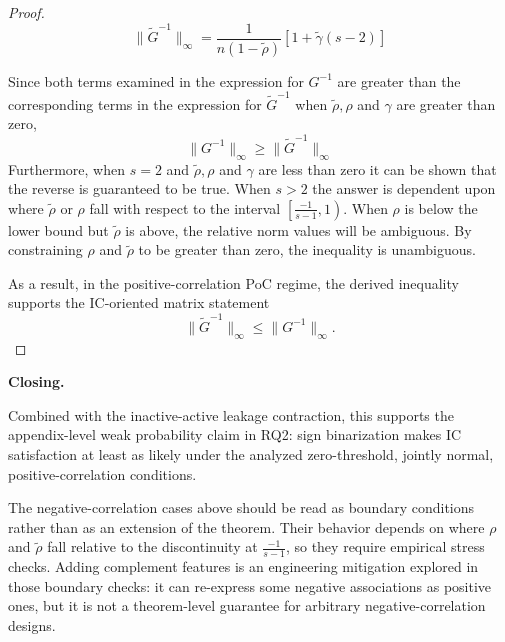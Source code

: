 \begin{proof}
\begin{equation}\label{eq:app-lemma4-binarized-inverse-norm}
\|\tilde{G}^{-1}\|_\infty = \frac{1}{n (1 - \tilde{\rho})} \left[ 1 + \tilde{\gamma} (s - 2) \right]
\end{equation}

Since both terms examined in the expression for $ G^{-1} $ are greater than the corresponding terms in the expression for $ \tilde{G}^{-1} $ when $ \tilde{\rho}, \rho $ and $ \gamma $ are greater than zero,
\begin{equation}\label{eq:app-lemma4-norm-order}
\|G^{-1}\|_\infty \geq \|\tilde{G}^{-1}\|_\infty
\end{equation}
Furthermore, when $ s = 2 $ and $ \tilde{\rho}, \rho $ and $ \gamma $ are less than zero it can be shown that the reverse is guaranteed to be true. When $ s > 2 $ the answer is dependent upon where $\tilde{\rho}$ or $ \rho $ fall with respect to the interval $ \left[\frac{-1}{s-1}, 1 \right) $. When $ \rho $ is below the lower bound but $ \tilde{\rho} $ is above, the relative norm values will be ambiguous.  By constraining $ \rho $ and $ \tilde{\rho} $ to be greater than zero, the inequality is unambiguous.

As a result, in the positive-correlation PoC regime, the derived inequality supports the IC-oriented matrix statement
\begin{equation}\label{eq:app-lemma4-final-inverse-norm-bound}
\|\tilde{G}^{-1}\|_\infty \leq \|G^{-1}\|_\infty.
\end{equation}
\end{proof}

\noindent\textbf{Closing.}

\noindent Combined with the inactive-active leakage contraction, this supports the appendix-level weak probability claim in RQ2: sign binarization makes IC satisfaction at least as likely under the analyzed zero-threshold, jointly normal, positive-correlation conditions.

The negative-correlation cases above should be read as boundary conditions rather than as an extension of the theorem. Their behavior depends on where $ \rho $ and $ \tilde{\rho} $ fall relative to the discontinuity at $ \frac{-1}{s-1} $, so they require empirical stress checks. Adding complement features is an engineering mitigation explored in those boundary checks: it can re-express some negative associations as positive ones, but it is not a theorem-level guarantee for arbitrary negative-correlation designs.

